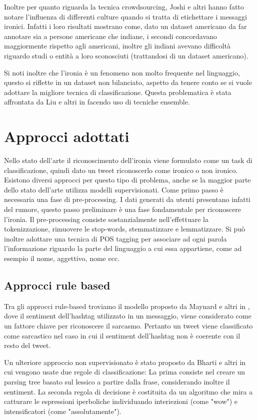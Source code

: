 \documentclass[oneside]{book}
\begin{document}
Inoltre per quanto riguarda la tecnica crowdsourcing, Joshi e altri \cite{survey5} hanno fatto notare l'influenza di differenti culture quando si tratta di etichettare i messaggi ironici. Infatti i loro risultati mostrano come, dato un dataset americano da far annotare sia a persone americane che indiane, i secondi concordavano maggiormente rispetto agli americani, inoltre gli indiani avevano difficoltà riguardo studi o entità a loro sconosciuti (trattandosi di un dataset americano).

Si noti inoltre che l'ironia è un fenomeno non molto frequente nel linguaggio, questo si riflette in un dataset non bilanciato, aspetto da tenere conto se si vuole adottare la migliore tecnica di classificazione. Questa problematica è stata affrontata da Liu e altri in \cite{imbalance} facendo uso di tecniche ensemble.


\section{Approcci adottati}
Nello stato dell'arte il riconoscimento dell'ironia viene formulato come un task di classificazione, quindi dato un tweet riconoscerlo come ironico o non ironico. Esistono  diversi approcci per questo tipo di problema, anche se la maggior parte dello stato dell'arte utilizza modelli supervisionati. Come primo passo è necessaria una fase di pre-processing. I dati generati da utenti presentano infatti del rumore, questo passo preliminare è una fase fondamentale per riconoscere l'ironia. Il pre-processing consiste sostanzialmente nell'effettuare la tokenizzazione, rimuovere le stop-words, stemmatizzare e lemmatizzare. Si può inoltre adottare una tecnica di POS tagging per associare ad ogni parola l'informazione riguardo la parte del linguaggio a cui essa appartiene, come ad esempio il nome, aggettivo, nome ecc.

\subsection{Approcci rule based}
Tra gli approcci rule-based troviamo il modello proposto da Maynard e altri in \cite{hashtag}, dove il sentiment dell'hashtag utilizzato in un messaggio, viene considerato come un fattore chiave per riconoscere il sarcasmo. Pertanto un tweet viene classificato come sarcastico nel caso in cui il sentiment dell'hashtag non è coerente con il resto del tweet.

Un ulteriore approccio non supervisionato è stato proposto da Bharti e altri \cite{parsing-tree} in cui vengono usate due regole di classificazione:
La prima consiste nel creare un parsing tree basato sul lessico a partire dalla frase, considerando inoltre il sentiment. La seconda regola di decisione è costituita da un algoritmo che mira a catturare le espressioni iperboliche individuando interiezioni (come "wow") e intensificatori (come "assolutamente").
\end{document}
